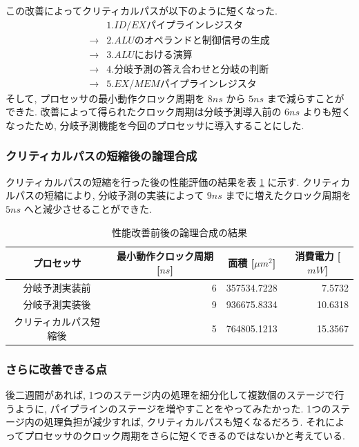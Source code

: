 \documentclass[../improvements.tex]{subfiles}
\begin{document}
  この改善によってクリティカルパスが以下のように短くなった. 
  \begin{displaymath}
    \begin{aligned}
      &1. ID/EX パイプラインレジスタ \\
      \rightarrow &2. ALU のオペランドと制御信号の生成 \\
      \rightarrow &3. ALU における演算 \\
      \rightarrow &4. 分岐予測の答え合わせと分岐の判断 \\
      \rightarrow &5. EX/MEM パイプラインレジスタ
    \end{aligned}
  \end{displaymath}
  そして, プロセッサの最小動作クロック周期を $8ns$ から $5ns$ まで減らすことができた.
  改善によって得られたクロック周期は分岐予測導入前の $6ns$ よりも短くなったため, 
  分岐予測機能を今回のプロセッサに導入することにした.

  \subsubsection{クリティカルパスの短縮後の論理合成}
  クリティカルパスの短縮を行った後の性能評価の結果を表 \ref{table:logic-synthesis-improved} に示す.
  クリティカルパスの短縮により, 分岐予測の実装によって $9ns$ までに増えたクロック周期を
  $5ns$ へと減少させることができた.

  \begin{table}[t]
    \centering
    \begin{tabular}{|c|r|r|r|}
    \hline
    プロセッサ & \multicolumn{1}{c|}{最小動作クロック周期 {[}$ns${]}} & \multicolumn{1}{c|}{面積 {[}$\mu m^2${]}} & \multicolumn{1}{c|}{消費電力 {[}$mW${]}} \\ \hline
    分岐予測実装前 & 6 & 357534.7228 & 7.5732 \\
    分岐予測実装後 & 9 & 936675.8334 & 10.6318 \\
    クリティカルパス短縮後 & 5 & 764805.1213 & 15.3567 \\ \hline
    \end{tabular}
    \caption{性能改善前後の論理合成の結果}
    \label{table:logic-synthesis-improved}
  \end{table}

  \subsubsection{さらに改善できる点}
  後二週間があれば, 1つのステージ内の処理を細分化して複数個のステージで行うように, 
  パイプラインのステージを増やすことをやってみたかった.
  1つのステージ内の処理負担が減少すれば, クリティカルパスも短くなるだろう.
  それによってプロセッサのクロック周期をさらに短くできるのではないかと考えている.
\end{document}
